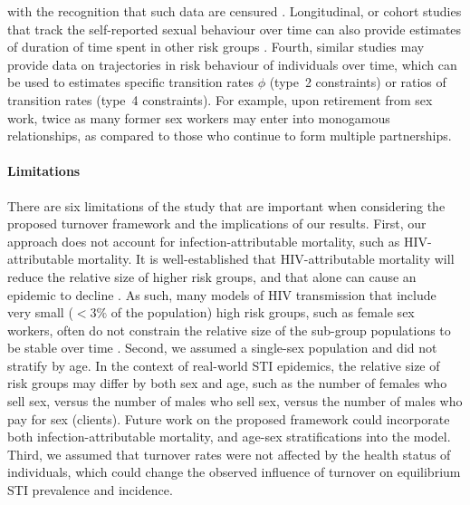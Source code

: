 with the recognition that such data are censured \citep{Watts2010}.
Longitudinal, or cohort studies
that track the self-reported sexual behaviour over time can also provide 
estimates of duration of time spent in other risk groups \citep{Fergus2007}.
Fourth, similar studies may provide data on
trajectories in risk behaviour of individuals over time,
which can be used to estimates specific transition rates $\phi$ (type~2 constraints)
or ratios of transition rates (type~4 constraints).
For example, upon retirement from sex work,
twice as many former sex workers may enter into monogamous relationships,
as compared to those who continue to form multiple partnerships.
\paragraph{Limitations}
There are six limitations of the study that are important when considering
the proposed turnover framework and the implications of our results.
First, our approach does not account for
infection-attributable mortality, such as HIV-attributable mortality.
It is well-established that HIV-attributable mortality will reduce the 
relative size of higher risk groups,
and that alone can cause an epidemic to decline \citep{Boily1997}.
As such, many models of HIV transmission
that include very small ($<3\%$ of the population)
high risk groups, such as female sex workers,
often do not constrain the relative size
of the sub-group populations to be stable over time
\citep{Pickles2013}.
Second, we assumed a single-sex population and did not stratify by age.
In the context of real-world STI epidemics,
the relative size of risk groups may differ
by both sex and age,
such as the number of females who sell sex,
versus the number of males who sell sex,
versus the number of males who pay for sex (clients).
Future work on the proposed framework could incorporate both
infection-attributable mortality, and age-sex stratifications into the model.
Third, we assumed that turnover rates were not affected by
the health status of individuals,
which could change the observed influence of turnover on
equilibrium STI prevalence and incidence.
